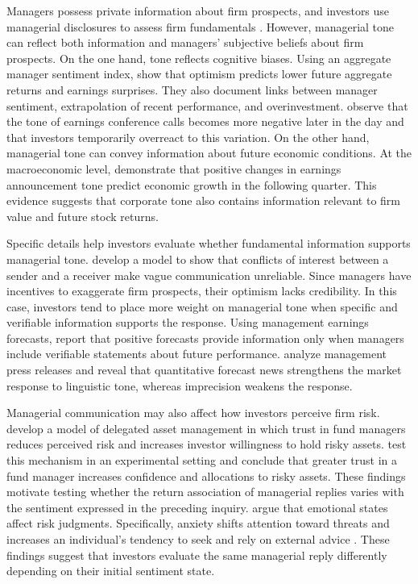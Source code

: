\documentclass[12pt]{article}
\begin{document}
Managers possess private information about firm prospects, and investors use managerial disclosures to assess firm fundamentals \citep{beyer2010financial,healy2001information}. However, managerial tone can reflect both information and managers' subjective beliefs about firm prospects. On the one hand, tone reflects cognitive biases. Using an aggregate manager sentiment index, \citet{jiang2019} show that optimism predicts lower future aggregate returns and earnings surprises. They also document links between manager sentiment, extrapolation of recent performance, and overinvestment. \citet{chen2018morning} observe that the tone of earnings conference calls becomes more negative later in the day and that investors temporarily overreact to this variation. On the other hand, managerial tone can convey information about future economic conditions. At the macroeconomic level, \citet{demers2024aggregate} demonstrate that positive changes in earnings announcement tone predict economic growth in the following quarter. This evidence suggests that corporate tone also contains information relevant to firm value and future stock returns.

Specific details help investors evaluate whether fundamental information supports managerial tone.  \citet{crawford1982} develop a model to show that conflicts of interest between a sender and a receiver make vague communication unreliable. Since managers have incentives to exaggerate firm prospects, their optimism lacks credibility. In this case, investors tend to place more weight on managerial tone when specific and verifiable information supports the response. Using management earnings forecasts, \citet{hutton2003} report that positive forecasts provide information only when managers include verifiable statements about future performance. \citet{baginski2016verification} analyze management press releases and reveal that quantitative forecast news strengthens the market response to linguistic tone, whereas imprecision weakens the response. 

Managerial communication may also affect how investors perceive firm risk. \citet{gennaioli2015} develop a model of delegated asset management in which trust in fund managers reduces perceived risk and increases investor willingness to hold risky assets. \citet{germann2025trust} test this mechanism in an experimental setting and conclude that greater trust in a fund manager increases confidence and allocations to risky assets. These findings motivate testing whether the return association of managerial replies varies with the sentiment expressed in the preceding inquiry. \citet{loewenstein2001risk} argue that emotional states affect risk judgments. Specifically, anxiety shifts attention toward threats and increases an individual's tendency to seek and rely on external advice \citep{eysenck2007anxiety,gino2012}. These findings suggest that investors evaluate the same managerial reply differently depending on their initial sentiment state.
\end{document}
